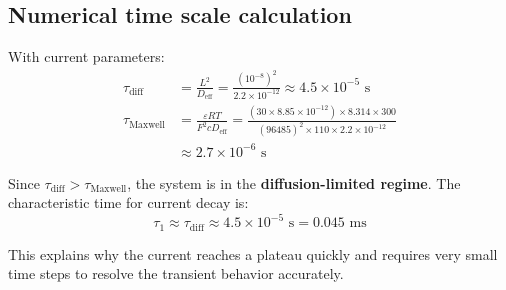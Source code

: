 \documentclass[11pt]{article}
\begin{document}
\subsection{Numerical time scale calculation}
With current parameters:
\begin{align}
\tau_{\text{diff}} &= \frac{L^2}{D_{\text{eff}}} = \frac{(10^{-8})^2}{2.2 \times 10^{-12}} \approx 4.5 \times 10^{-5} \text{ s} \\
\tau_{\text{Maxwell}} &= \frac{\varepsilon RT}{F^2 c D_{\text{eff}}} = \frac{(30 \times 8.85 \times 10^{-12}) \times 8.314 \times 300}{(96485)^2 \times 110 \times 2.2 \times 10^{-12}} \\
&\approx 2.7 \times 10^{-6} \text{ s}
\end{align}

Since $\tau_{\text{diff}} > \tau_{\text{Maxwell}}$, the system is in the \textbf{diffusion-limited regime}. The characteristic time for current decay is:
\begin{equation}
\tau_1 \approx \tau_{\text{diff}} \approx 4.5 \times 10^{-5} \text{ s} = 0.045 \text{ ms}
\end{equation}

This explains why the current reaches a plateau quickly and requires very small time steps to resolve the transient behavior accurately.
\end{document}
